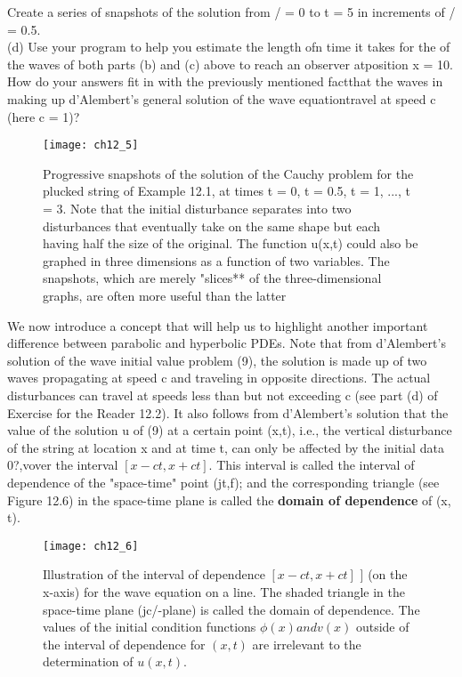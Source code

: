 \documentclass[../main.tex]{subfiles}
\begin{document}
Create a series of snapshots of the solution from / = 0 to t = 5 in increments of / = 0.5.\\(d) Use your program to help you estimate the length ofn time it takes for the of the waves of both parts (b) and (c) above to reach an observer atposition x = 10. How do your answers fit in with the previously mentioned factthat the waves in making up d'Alembert's general solution of the wave equationtravel at speed c (here c = 1)? 
\begin{figure}[H]
	\centering
	\texttt{[image: ch12\_5]}
	\caption{\textsf{ Progressive snapshots of the solution of the Cauchy problem for the
plucked string of Example 12.1, at times t = 0, t = 0.5, t = 1, ..., t = 3. Note that the initial
disturbance separates into two disturbances that eventually take on the same shape but each
having half the size of the original. The function u(x,t) could also be graphed in three
dimensions as a function of two variables. The snapshots, which are merely "slices** of the
three-dimensional graphs, are often more useful than the latter}}
	\label{pfig:ch12_5}
\end{figure}
We now introduce a concept that will help us to highlight another important
difference between parabolic and hyperbolic PDEs. Note that from d'Alembert's
solution of the wave initial value problem (9), the solution is made up of two
waves propagating at speed c and traveling in opposite directions. The actual
disturbances can travel at speeds less than but not exceeding c (see part (d) of
Exercise for the Reader 12.2). It also follows from d'Alembert's solution that the
value of the solution u of (9) at a certain point (x,t), i.e., the vertical disturbance of
the string at location x and at time t, can only be affected by the initial data
0?,vover the interval $[x-ct,x + ct]$. This interval is called the interval of 
dependence of the "space-time" point (jt,f); and the corresponding triangle (see
Figure 12.6) in the space-time plane is called the \textbf{domain of dependence} of (x, t).
\begin{figure}[H]
	\centering
	\texttt{[image: ch12\_6]}
	\caption{\textsf{  Illustration of the interval of dependence $[x-ct, x+ct]$ ] (on the x-axis)
for the wave equation on a line. The shaded triangle in the space-time plane (jc/-plane) is
called the domain of dependence. The values of the initial condition functions $\phi(x) and v(x)$ outside of the interval of dependence for $(x,t)$ are irrelevant to the
determination of $u(x,t)$. 
}}
	\label{pfig:ch12_6}
\end{figure}
\end{document}
